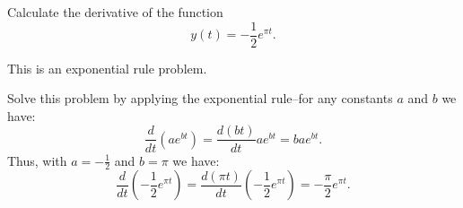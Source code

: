 \documentclass{ximera}
\author{Emma Smith Zbarsky}
\begin{document}
\begin{exercise}

Calculate the derivative of the function
\[y(t) = -\frac{1}{2}e^{\pi t}.\]


\begin{hint}
This is an exponential rule problem.
\end{hint}


\begin{hint}
Solve this problem by applying the exponential rule--for any constants
$a$ and $b$ we have:
\[\frac{d}{dt}\left(ae^{bt}\right) =\frac{d(bt)}{dt}ae^{bt} =  bae^{bt}.\]
Thus, with $a=-\frac{1}{2}$ and $b=\pi$ we have:
\[\frac{d}{dt}\left(-\frac{1}{2}e^{\pi t}\right) = \frac{d(\pi t)}{dt} \left(-\frac{1}{2} e^{\pi t}\right) = \boxed{-\frac{\pi}{2}e^{\pi t}}.\]
\end{hint}


\begin{multipleChoice}
\end{multipleChoice}

\end{exercise}
\end{document}
